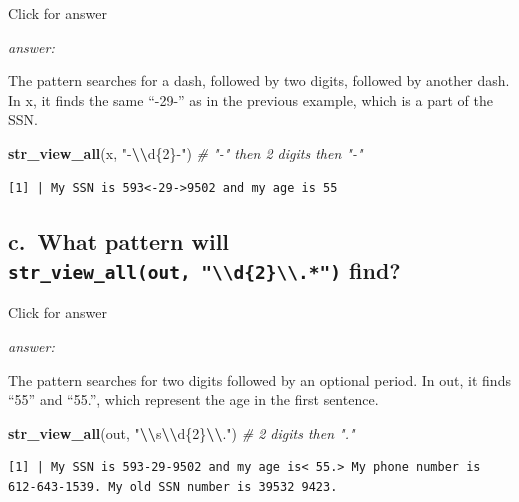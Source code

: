 \documentclass[
]{book}
\newenvironment{Shaded}{\begin{snugshade}}{\end{snugshade}}
\newcommand{\CommentTok}[1]{\textcolor[rgb]{0.56,0.35,0.01}{\textit{#1}}}
\newcommand{\FunctionTok}[1]{\textcolor[rgb]{0.13,0.29,0.53}{\textbf{#1}}}
\newcommand{\NormalTok}[1]{#1}
\newcommand{\SpecialCharTok}[1]{\textcolor[rgb]{0.81,0.36,0.00}{\textbf{#1}}}
\newcommand{\StringTok}[1]{\textcolor[rgb]{0.31,0.60,0.02}{#1}}
\begin{document}
Click for answer

\emph{answer:}

The pattern searches for a dash, followed by two digits, followed by another dash. In x, it finds the same ``-29-'' as in the previous example, which is a part of the SSN.

\begin{Shaded}
\begin{Highlighting}[]
\FunctionTok{str\_view\_all}\NormalTok{(x, }\StringTok{"{-}}\SpecialCharTok{\textbackslash{}\textbackslash{}}\StringTok{d\{2\}{-}"}\NormalTok{)  }\CommentTok{\# "{-}" then 2 digits then "{-}"}
\end{Highlighting}
\end{Shaded}

\begin{verbatim}
[1] | My SSN is 593<-29->9502 and my age is 55
\end{verbatim}

\hypertarget{c.-what-pattern-will-str_view_allout-d2.-find}{%
\subsection{\texorpdfstring{c.~What pattern will \texttt{str\_view\_all(out,\ "\textbackslash{}\textbackslash{}d\{2\}\textbackslash{}\textbackslash{}.*")} find?}{c.~What pattern will str\_view\_all(out, "\textbackslash\textbackslash d\{2\}\textbackslash\textbackslash.*") find?}}\label{c.-what-pattern-will-str_view_allout-d2.-find}}

Click for answer

\emph{answer:}

The pattern searches for two digits followed by an optional period. In out, it finds ``55'' and ``55.'', which represent the age in the first sentence.

\begin{Shaded}
\begin{Highlighting}[]
\FunctionTok{str\_view\_all}\NormalTok{(out, }\StringTok{"}\SpecialCharTok{\textbackslash{}\textbackslash{}}\StringTok{s}\SpecialCharTok{\textbackslash{}\textbackslash{}}\StringTok{d\{2\}}\SpecialCharTok{\textbackslash{}\textbackslash{}}\StringTok{."}\NormalTok{)  }\CommentTok{\# 2 digits then "."}
\end{Highlighting}
\end{Shaded}

\begin{verbatim}
[1] | My SSN is 593-29-9502 and my age is< 55.> My phone number is 612-643-1539. My old SSN number is 39532 9423.
\end{verbatim}
\end{document}

